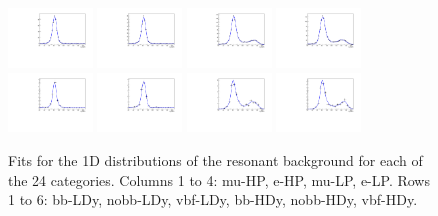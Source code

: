 \begin{figure}[htbp]
  \includegraphics[width=0.2\textwidth]{fig/analysisAppendix/LNuJJ_res_MJJ_mu_HP_nobb_HDy.pdf}
  \includegraphics[width=0.2\textwidth]{fig/analysisAppendix/LNuJJ_res_MJJ_e_HP_nobb_HDy.pdf}
  \includegraphics[width=0.2\textwidth]{fig/analysisAppendix/LNuJJ_res_MJJ_mu_LP_nobb_HDy.pdf}
  \includegraphics[width=0.2\textwidth]{fig/analysisAppendix/LNuJJ_res_MJJ_e_LP_nobb_HDy.pdf}\\
  \includegraphics[width=0.2\textwidth]{fig/analysisAppendix/LNuJJ_res_MJJ_mu_HP_vbf_HDy.pdf}
  \includegraphics[width=0.2\textwidth]{fig/analysisAppendix/LNuJJ_res_MJJ_e_HP_vbf_HDy.pdf}
  \includegraphics[width=0.2\textwidth]{fig/analysisAppendix/LNuJJ_res_MJJ_mu_LP_vbf_HDy.pdf}
  \includegraphics[width=0.2\textwidth]{fig/analysisAppendix/LNuJJ_res_MJJ_e_LP_vbf_HDy.pdf}\\
  \caption{
    Fits for the 1D \MJ distributions of the resonant background for each of the 24 categories.
    Columns 1 to 4: mu-HP, e-HP, mu-LP, e-LP.
    Rows 1 to 6: bb-LDy, nobb-LDy, vbf-LDy, bb-HDy, nobb-HDy, vbf-HDy.
  }
  \label{fig:fits_res_MJJ_Run2}
\end{figure}

